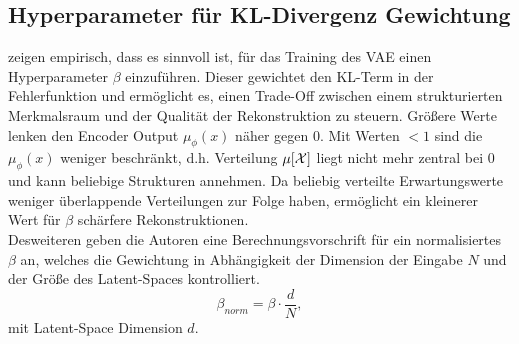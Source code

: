 \subsection{Hyperparameter für KL-Divergenz Gewichtung}\label{sec:beta_vae}
\cite{Higgins2017} zeigen empirisch, dass es sinnvoll ist, für das Training des VAE einen Hyperparameter $\beta$ einzuführen. Dieser gewichtet den KL-Term in der Fehlerfunktion und ermöglicht es, einen Trade-Off zwischen einem strukturierten Merkmalsraum und der Qualität der Rekonstruktion zu steuern. Größere Werte lenken den Encoder Output $\mu_\phi(x)$ näher gegen 0. Mit Werten $< 1$ sind die $\mu_\phi(x)$ weniger beschränkt, d.h. Verteilung $\mu[\mathcal{X}]$ liegt nicht mehr zentral bei 0 und kann beliebige Strukturen annehmen. Da beliebig verteilte Erwartungswerte weniger überlappende Verteilungen zur Folge haben, ermöglicht ein kleinerer Wert für $\beta$ schärfere Rekonstruktionen. \\

Desweiteren geben die Autoren eine Berechnungsvorschrift für ein normalisiertes $\beta$ an, welches die Gewichtung in Abhängigkeit der Dimension der Eingabe $N$ und der Größe des Latent-Spaces kontrolliert.
\begin{equation}
  \beta_{norm} = \beta \cdot \frac{d}{N}, 
\end{equation}
mit Latent-Space Dimension $d$.
